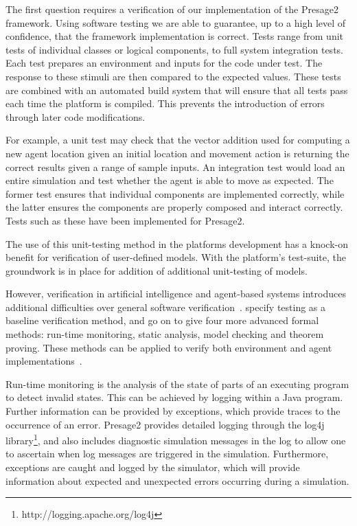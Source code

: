 The first question requires a verification of our implementation of the Presage2
framework. Using software testing we are able to guarantee, up to a high level of
confidence, that the framework implementation is correct. Tests range from unit
tests of individual classes or logical components, to full system integration
tests. Each test prepares an environment and inputs for the code under test. The
response to these stimuli are then compared to the expected values. These tests
are combined with an automated build system that will ensure that all tests pass
each time the platform is compiled. This prevents the introduction of errors
through later code modifications.

For example, a unit test may check that the vector addition used for computing
a new agent location given an initial location and movement action is
returning the correct results given a range of sample inputs. An integration
test would load an entire simulation and test whether the agent is able to
move as expected. The former test ensures that individual components are
implemented correctly, while the latter ensures the components are properly
composed and interact correctly. Tests such as these have been implemented for Presage2.

The use of this unit-testing method in the platforms development has a knock-on
benefit for verification of user-defined models. With the platform's test-suite,
the groundwork is in place for addition of additional unit-testing of models.

However, verification in artificial intelligence and agent-based systems
introduces additional difficulties over general software
verification~\citep{Wooldridge1998}. \citet{Menzies2005} specify testing as a
baseline verification method, and go on to give four more advanced formal
methods: run-time monitoring, static analysis, model checking and theorem
proving. These methods can be applied to verify both environment and agent
implementations~\citep{Sudeikat2007a}.

Run-time monitoring is the analysis of the state of parts of an executing
program to detect invalid states. This can be achieved by logging within a
Java program. Further information can be provided by exceptions, which provide
traces to the occurrence of an error. Presage2 provides detailed logging through
the log4j library\footnote{http://logging.apache.org/log4j}, and also includes diagnostic simulation messages in the log
to allow one to ascertain when log messages are triggered in the simulation.
Furthermore, exceptions are caught and logged by the simulator, which will
provide information about expected and unexpected errors occurring during a
simulation.

